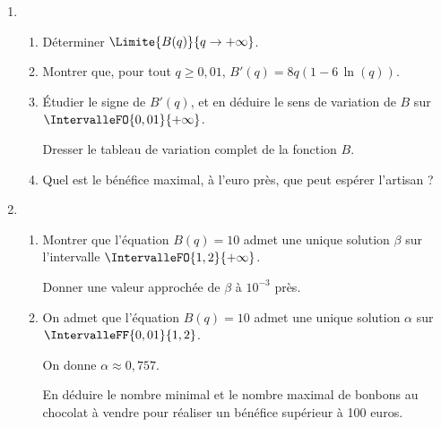 \begin{enumerate}
	\item 
	\begin{enumerate}
		\item Déterminer $\Limite{B(q)}{q \to +\infty}$.
		\item Montrer que, pour tout $q \geqslant 0,01$, $B'(q)=8q(1-6\,\ln(q))$.
		\item Étudier le signe de $B'(q)$, et en déduire le sens de variation de $B$ sur $\IntervalleFO{0,01}{+\infty}$.
		
		Dresser le tableau de variation complet de la fonction $B$.
		\item Quel est le bénéfice maximal, à l'euro près, que peut espérer l'artisan ?
	\end{enumerate}
	\item 
	\begin{enumerate}
		\item Montrer que l'équation $B(q)= 10$ admet une unique solution $\beta$ sur l'intervalle $\IntervalleFO{1,2}{+\infty}$.
		
		Donner une valeur approchée de $\beta$ à $10^{-3}$ près.
		\item On admet que l'équation $B(q)= 10$ admet une unique solution $\alpha$ sur $\IntervalleFF{0,01}{1,2}$.
		
		On donne $\alpha \approx 0,757$.
		
		En déduire le nombre minimal et le nombre maximal de bonbons au chocolat à vendre pour réaliser un bénéfice supérieur à 100 euros. 
	\end{enumerate}
\end{enumerate}